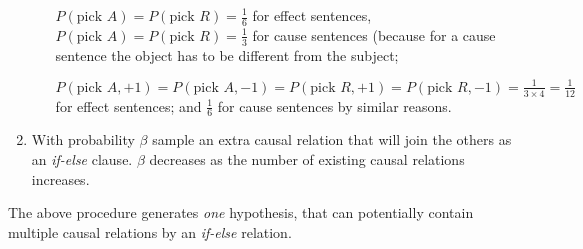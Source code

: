 \documentclass[11pt]{article}
\begin{document}
\begin{enumerate}
\begin{enumerate}
	$P(\text{pick }A) = P(\text{pick }R) = \frac{1}{6}$ for effect sentences,
	$P(\text{pick }A) = P(\text{pick }R) = \frac{1}{3}$ for cause sentences 
	(because for a cause sentence the object has to be different from the subject;

	$P(\text{pick }A, +1) = P(\text{pick }A, -1) = P(\text{pick }R, +1) = P(\text{pick }R, -1) = \frac{1}{3 \times 4} = \frac{1}{12}$ for effect sentences;
	and $\frac{1}{6}$ for cause sentences by similar reasons.


\end{enumerate}



\item With probability $\beta$ sample an extra causal relation
that will join the others as an \textit{if-else} clause.
$\beta$ decreases as the number of existing causal relations increases.

\end{enumerate} 

The above procedure generates \textit{one} hypothesis, 
that can potentially contain multiple causal relations by an \textit{if-else} relation.
















\end{document}

